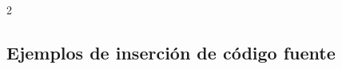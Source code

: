 	\lipsum[4]

	\begin{multicols}{2}

		\lipsum[4-5]
		
		
		\lipsum[1]
		
		
		\lipsum[11-13]

	\end{multicols}

\subsection{Ejemplos de inserción de código fuente}

	\newcommand{\insertsrcmanual}[2]{\href{https://template-latex.github.io/informe.html?srctype=#1\#hlp-srccode}{#2}}

